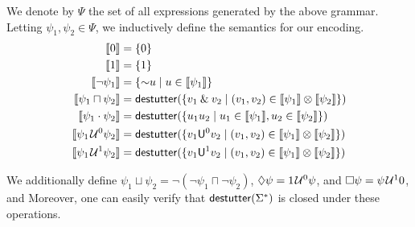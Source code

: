 We denote by $\Psi$ the set of all expressions generated by the above grammar.
Letting $\psi_1, \psi_2 \in \Psi$, we inductively define the semantics for our encoding.
\begin{align*}
		\llbracket 0 \rrbracket &=  \{ 0 \} \\
		\llbracket 1 \rrbracket &=  \{ 1 \} \\
		\llbracket \lnot \psi_1 \rrbracket &= \{ \BitNeg u \st u \in \llbracket \psi_1 \rrbracket \} \\
		\llbracket \psi_1 \sqcap \psi_2 \rrbracket &= \destutter(\{ v_1 \BitAnd v_2 \st (v_1,v_2) \in \llbracket \psi_1 \rrbracket \otimes \llbracket \psi_2 \rrbracket \}) \\
		\llbracket \psi_1 \cdot \psi_2 \rrbracket &= \destutter(\{ u_1 u_2 \st u_1 \in \llbracket \psi_1 \rrbracket, u_2 \in \llbracket \psi_2 \rrbracket \}) \\
		\llbracket \psi_1 \until^0 \psi_2 \rrbracket &= \destutter(\{ v_1 \mathsf{U}^0 v_2  \st (v_1,v_2) \in \llbracket \psi_1 \rrbracket \otimes \llbracket \psi_2 \rrbracket \}) \\
		\llbracket \psi_1 \until^1 \psi_2 \rrbracket &= \destutter(\{ v_1 \mathsf{U}^1 v_2  \st (v_1,v_2) \in \llbracket \psi_1 \rrbracket \otimes \llbracket \psi_2 \rrbracket \}) \\
\end{align*}

We additionally define $\psi_1 \sqcup \psi_2 = \lnot (\lnot \psi_1 \sqcap \lnot \psi_2)$, $\lozenge \psi = 1 \kern.1em\mathcal{U}^0 \psi$, and $\square \psi = \psi \kern.1em\mathcal{U}^1 0$, and 
Moreover, one can easily verify that $\mathsf{destutter}(\Sigma^*)$ is closed under these operations.

